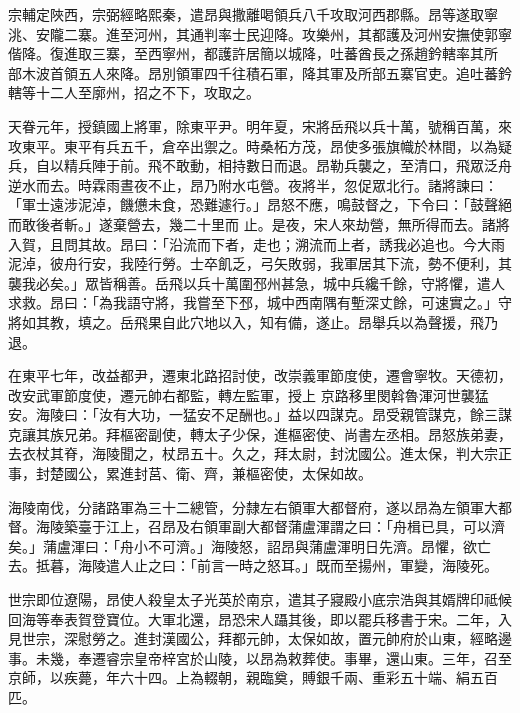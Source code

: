 \begin{pinyinscope}
 宗輔定陜西，宗弼經略熙秦，遣昂與撒離喝領兵八千攻取河西郡縣。昂等遂取寧洮、安隴二寨。進至河州，其通判率士民迎降。攻樂州，其都護及河州安撫使郭寧偕降。復進取三寨，至西寧州，都護許居簡以城降，吐蕃酋長之孫趙鈐轄率其所
 部木波首領五人來降。昂別領軍四千往積石軍，降其軍及所部五寨官吏。追吐蕃鈐轄等十二人至廓州，招之不下，攻取之。



 天眷元年，授鎮國上將軍，除東平尹。明年夏，宋將岳飛以兵十萬，號稱百萬，來攻東平。東平有兵五千，倉卒出禦之。時桑柘方茂，昂使多張旗幟於林間，以為疑兵，自以精兵陣于前。飛不敢動，相持數日而退。昂勒兵襲之，至清口，飛眾泛舟逆水而去。時霖雨晝夜不止，昂乃附水屯營。夜將半，忽促眾北行。諸將諫曰：「軍士遠涉泥淖，饑憊未食，恐難遽行。」昂怒不應，鳴鼓督之，下令曰：「鼓聲絕而敢後者斬。」遂棄營去，幾二十里而
 止。是夜，宋人來劫營，無所得而去。諸將入賀，且問其故。昂曰：「沿流而下者，走也；溯流而上者，誘我必追也。今大雨泥淖，彼舟行安，我陸行勞。士卒飢乏，弓矢敗弱，我軍居其下流，勢不便利，其襲我必矣。」眾皆稱善。岳飛以兵十萬圍邳州甚急，城中兵纔千餘，守將懼，遣人求救。昂曰：「為我語守將，我嘗至下邳，城中西南隅有塹深丈餘，可速實之。」守將如其教，填之。岳飛果自此穴地以入，知有備，遂止。昂舉兵以為聲援，飛乃退。



 在東平七年，改益都尹，遷東北路招討使，改崇義軍節度使，遷會寧牧。天德初，改安武軍節度使，遷元帥右都監，轉左監軍，授上
 京路移里閔斡魯渾河世襲猛安。海陵曰：「汝有大功，一猛安不足酬也。」益以四謀克。昂受親管謀克，餘三謀克讓其族兄弟。拜樞密副使，轉太子少保，進樞密使、尚書左丞相。昂怒族弟妻，去衣杖其脊，海陵聞之，杖昂五十。久之，拜太尉，封沈國公。進太保，判大宗正事，封楚國公，累進封莒、衛、齊，兼樞密使，太保如故。



 海陵南伐，分諸路軍為三十二總管，分隸左右領軍大都督府，遂以昂為左領軍大都督。海陵築臺于江上，召昂及右領軍副大都督蒲盧渾謂之曰：「舟楫已具，可以濟矣。」蒲盧渾曰：「舟小不可濟。」海陵怒，詔昂與蒲盧渾明日先濟。昂懼，欲亡
 去。抵暮，海陵遣人止之曰：「前言一時之怒耳。」既而至揚州，軍變，海陵死。



 世宗即位遼陽，昂使人殺皇太子光英於南京，遣其子寢殿小底宗浩與其婿牌印祗候回海等奉表賀登寶位。大軍北還，昂恐宋人躡其後，即以罷兵移書于宋。二年，入見世宗，深慰勞之。進封漢國公，拜都元帥，太保如故，置元帥府於山東，經略邊事。未幾，奉遷睿宗皇帝梓宮於山陵，以昂為敕葬使。事畢，還山東。三年，召至京師，以疾薨，年六十四。上為輟朝，親臨奠，賻銀千兩、重彩五十端、絹五百匹。




\end{pinyinscope}
